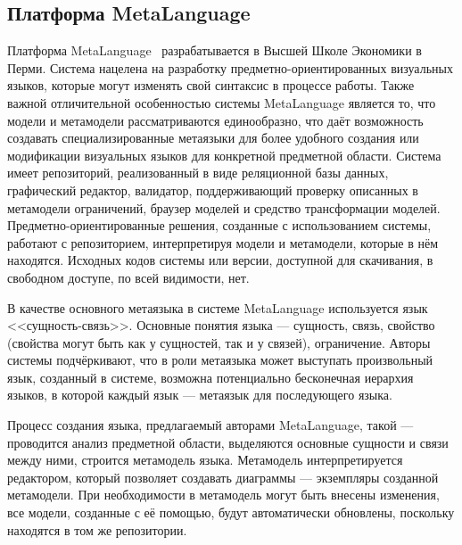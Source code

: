 \subsection{Платформа MetaLanguage}
Платформа MetaLanguage~\cite{sukhov2012approach, lyadova2008language, lyadova2010instruments, sukhov2013disser}
разрабатывается в Высшей Школе Экономики в Перми. Система нацелена на разработку предметно-ориентированных
визуальных языков, которые могут изменять свой синтаксис в процессе работы. Также важной
отличительной особенностью системы MetaLanguage является то, что модели и метамодели рассматриваются
единообразно, что даёт возможность создавать специализированные метаязыки для более удобного
создания или модификации визуальных языков для конкретной предметной области. Система
имеет репозиторий, реализованный в виде реляционной базы данных, графический редактор, валидатор,
поддерживающий проверку описанных в метамодели ограничений, браузер моделей и средство трансформации
моделей. Предметно-ориентированные решения, созданные с использованием системы, работают
с репозиторием, интерпретируя модели и метамодели, которые в нём находятся. Исходных кодов системы 
или версии, доступной для скачивания, в свободном доступе, по всей видимости, нет.

В качестве основного метаязыка в системе MetaLanguage используется язык <<сущность-связь>>. Основные понятия языка ---
сущность, связь, свойство (свойства могут быть как у сущностей, так и у связей), ограничение.
Авторы системы подчёркивают, что в роли метаязыка может выступать произвольный язык, созданный в системе,
возможна потенциально бесконечная иерархия языков, в которой каждый язык ---
метаязык для последующего языка.

Процесс создания языка, предлагаемый авторами MetaLanguage, такой --- проводится анализ 
предметной области, выделяются основные сущности и связи между ними, строится метамодель языка.
Метамодель интерпретируется редактором, который позволяет создавать диаграммы --- экземпляры
созданной метамодели. При необходимости в метамодель могут быть внесены изменения, все 
модели, созданные с её помощью, будут автоматически обновлены, поскольку находятся в том же репозитории.

